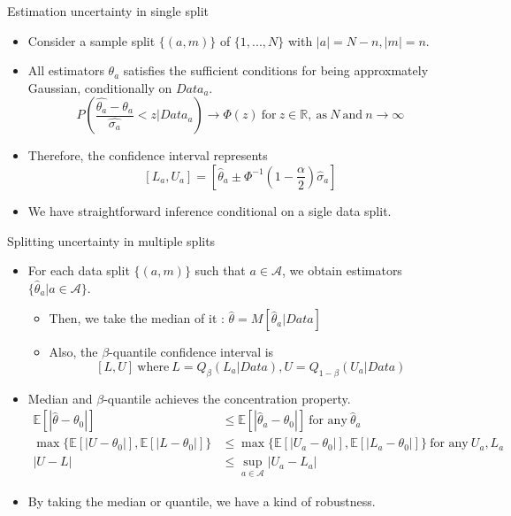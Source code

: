 \documentclass[xcolor=svgnames,aspectratio=169]{beamer}
\newcommand{\R}{\mathbb{R}}
\newcommand{\E}{\mathbb{E}}
\begin{document}
\begin{frame}{Estimation uncertainty in single split}
    \begin{itemize}
        \item Consider a sample split $\{(a,m)\}$ of $\{1,...,N\}$ with $|a|=N-n, |m|=n$.
        \item All estimators $\theta_a$ satisfies the sufficient conditions for being approxmately Gaussian, conditionally on $Data_a$.
        \[
        P(\frac{\hat{\theta_a}-\theta_a}{\hat{\sigma_a}}<z|Data_a) \to \Phi(z) \ \text{for} \ z\in\R, \ \text{as} \ N \ \text{and} \ n\to\infty
        \]
        \item Therefore, the confidence interval represents
        \[
        [L_a, U_a]=[\hat{\theta}_a\pm \Phi^{-1}(1-\frac{\alpha}{2})\hat{\sigma}_a]
        \]
        \item We have straightforward inference conditional on a sigle data split.
    \end{itemize}
\end{frame}

\begin{frame}{Splitting uncertainty in multiple splits}
    \begin{itemize}
        \item For each data split $\{(a,m)\}$ such that $a\in \mathcal{A} $, we obtain estimators $\{\hat{\theta}_a|a\in\mathcal{A} \}$.
        \begin{itemize}
            \item Then, we take the median of it : $\hat{\theta}=M[\hat{\theta}_a|Data]$
            \item Also, the $\beta$-quantile confidence interval is 
            \[
            [L,U] \  \text{where} \ L=Q_{\beta}(L_a|Data), U=Q_{1-\beta}(U_a|Data)
            \]
        \end{itemize}
        \item Median and $\beta$-quantile achieves the \alert{concentration} property.
        \begin{align*}
            \E[|\hat{\theta}-\theta_0|]&\leq \E[|\hat{\theta}_a-\theta_0|] \ \text{for any} \ \hat{\theta}_a \\
            \max\{\E[|U-\theta_0|], \E[|L-\theta_0|]\}&\leq \max\{\E[|U_a-\theta_0|], \E[|L_a-\theta_0|]\} \ \text{for any} \ U_a, L_a \\
            |U-L|&\leq \sup_{a\in\mathcal{A} }|U_a-L_a|
        \end{align*}
        \item By taking the median or quantile, we have a kind of robustness. 
    \end{itemize}
\end{frame}
\end{document}
